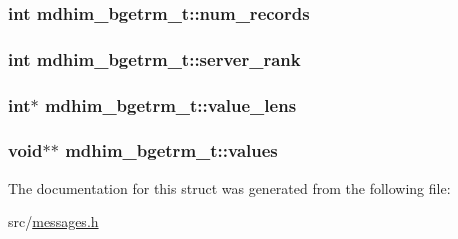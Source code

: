 \hypertarget{structmdhim__bgetrm__t_a3d398b31f450603e67b854ab563180e8}{
\subsubsection[{num\-\_\-records}]{\setlength{\rightskip}{0pt plus 5cm}int mdhim\-\_\-bgetrm\-\_\-t\-::num\-\_\-records}}\label{d0/d48/structmdhim__bgetrm__t_a3d398b31f450603e67b854ab563180e8}
\hypertarget{structmdhim__bgetrm__t_a3113667adc0eafe85d22c273766bce7f}{
\subsubsection[{server\-\_\-rank}]{\setlength{\rightskip}{0pt plus 5cm}int mdhim\-\_\-bgetrm\-\_\-t\-::server\-\_\-rank}}\label{d0/d48/structmdhim__bgetrm__t_a3113667adc0eafe85d22c273766bce7f}
\hypertarget{structmdhim__bgetrm__t_add99791a3bc82e16120388d1dc0f3ba7}{
\subsubsection[{value\-\_\-lens}]{\setlength{\rightskip}{0pt plus 5cm}int$\ast$ mdhim\-\_\-bgetrm\-\_\-t\-::value\-\_\-lens}}\label{d0/d48/structmdhim__bgetrm__t_add99791a3bc82e16120388d1dc0f3ba7}
\hypertarget{structmdhim__bgetrm__t_a322850d7fda46b0c170ca98342a81779}{
\subsubsection[{values}]{\setlength{\rightskip}{0pt plus 5cm}void$\ast$$\ast$ mdhim\-\_\-bgetrm\-\_\-t\-::values}}\label{d0/d48/structmdhim__bgetrm__t_a322850d7fda46b0c170ca98342a81779}


The documentation for this struct was generated from the following file\-:\begin{DoxyCompactItemize}
\item 
src/\hyperlink{messages_8h}{messages.\-h}\end{DoxyCompactItemize}
